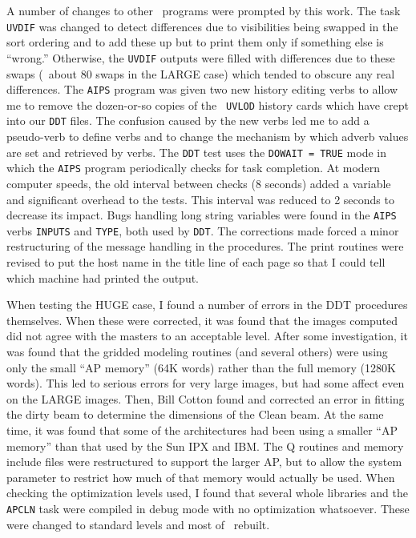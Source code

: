 A number of changes to other \AIPS\ programs were prompted by this
work.  The task {\tt UVDIF} was changed to detect differences due to
visibilities being swapped in the sort ordering and to add these up
but to print them only if something else is ``wrong.''  Otherwise, the
{\tt UVDIF} outputs were filled with differences due to these swaps
(\eg\ about 80 swaps in the LARGE case) which tended to obscure any
real differences.  The {\tt AIPS} program was given two new history
editing verbs to allow me to remove the dozen-or-so copies of the {\tt
UVLOD} history cards which have crept into our {\tt DDT} files.  The
confusion caused by the new verbs led me to add a pseudo-verb to
define verbs and to change the mechanism by which adverb values are
set and retrieved by verbs.  The {\tt DDT} test uses the {\tt DOWAIT =
TRUE} mode in which the {\tt AIPS} program periodically checks for
task completion.  At modern computer speeds, the old interval between
checks (8 seconds) added a variable and significant overhead to the
tests.  This interval was reduced to 2 seconds to decrease its impact.
Bugs handling long string variables were found in the {\tt AIPS} verbs
{\tt INPUTS} and {\tt TYPE}, both used by \hbox{{\tt DDT}}.  The
corrections made forced a minor restructuring of the message handling
in the procedures.  The print routines were revised to put the host
name in the title line of each page so that I could tell which machine
had printed the output.

When testing the HUGE case, I found a number of errors in the DDT
procedures themselves.  When these were corrected, it was found that
the images computed did not agree with the masters to an acceptable
level.  After some investigation, it was found that the gridded
modeling routines (and several others) were using only the small ``AP
memory'' (64K words) rather than the full memory (1280K words).  This
led to serious errors for very large images, but had some affect even
on the LARGE images.  Then, Bill Cotton found and corrected an error in
fitting the dirty beam to determine the dimensions of the Clean beam.
At the same time, it was found that some of the architectures had been
using a smaller ``AP memory'' than that used by the Sun IPX and
\hbox{IBM}.  The Q routines and memory include files were restructured
to support the larger AP, but to allow the system parameter to
restrict how much of that memory would actually be used.  When
checking the optimization levels used, I found that several whole
libraries and the {\tt APCLN} task were compiled in debug mode with no
optimization whatsoever.  These were changed to standard levels and
most of \AIPS\ rebuilt.

